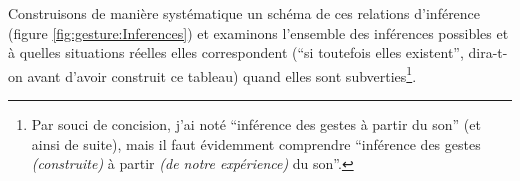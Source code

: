 \indent Construisons de manière systématique un schéma de ces relations d'inférence (figure \ref{fig:gesture:Inferences}) et examinons l'ensemble des inférences possibles et à quelles situations réelles elles correspondent (``si toutefois elles existent'', dira-t-on avant d'avoir construit ce tableau) quand elles sont subverties\footnote{Par souci de concision, j'ai noté ``inférence des gestes à partir du son'' (et ainsi de suite), mais il faut évidemment comprendre ``inférence des gestes \textit{(construite)} à partir \textit{(de notre expérience)} du son''.}.
\begin{figure}[!htbp]
	\captionsetup{format=plain}%
\end{figure}

